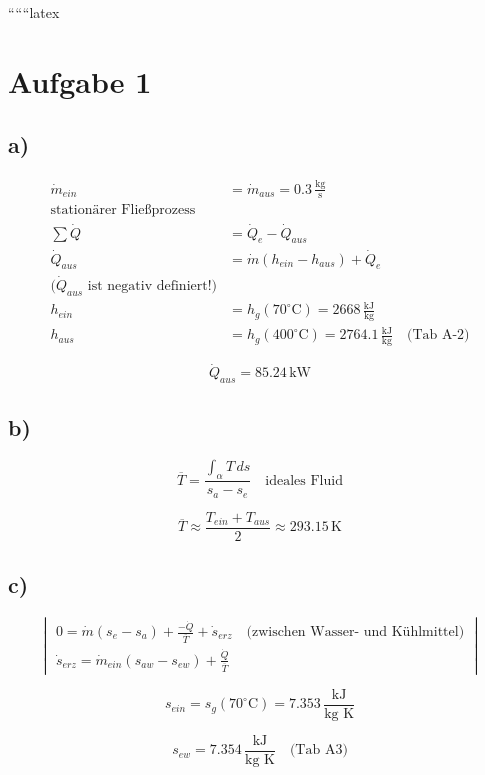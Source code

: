 
``````latex


\section*{Aufgabe 1}

\subsection*{a)}
\begin{align*}
\dot{m}_{ein} &= \dot{m}_{aus} = 0.3 \, \frac{\text{kg}}{\text{s}} \\
\text{stationärer Fließprozess} \\
\sum \dot{Q} &= \dot{Q}_e - \dot{Q}_{aus} \\
\dot{Q}_{aus} &= \dot{m} (h_{ein} - h_{aus}) + \dot{Q}_e \\
\text{(}\dot{Q}_{aus} \text{ ist negativ definiert!)} \\
h_{ein} &= h_{g} (70^\circ \text{C}) = 2668 \, \frac{\text{kJ}}{\text{kg}} \\
h_{aus} &= h_{g} (400^\circ \text{C}) = 2764.1 \, \frac{\text{kJ}}{\text{kg}} \quad \text{(Tab A-2)}
\end{align*}

\[
\dot{Q}_{aus} = 85.24 \, \text{kW}
\]

\subsection*{b)}
\[
\overline{T} = \frac{\int_{\alpha} T \, ds}{s_a - s_e} \quad \text{ideales Fluid}
\]

\[
\overline{T} \approx \frac{T_{ein} + T_{aus}}{2} \approx 293.15 \, \text{K}
\]

\subsection*{c)}
\[
\begin{vmatrix}
0 = \dot{m} (s_e - s_a) + \frac{-\dot{Q}}{\overline{T}} + \dot{s}_{erz} \quad \text{(zwischen Wasser- und Kühlmittel)} \\
\dot{s}_{erz} = \dot{m}_{ein} (s_{aw} - s_{ew}) + \frac{\dot{Q}}{\overline{T}}
\end{vmatrix}
\]

\[
s_{ein} = s_g (70^\circ \text{C}) = 7.353 \, \frac{\text{kJ}}{\text{kg K}}
\]

\[
s_{ew} = 7.354 \, \frac{\text{kJ}}{\text{kg K}} \quad \text{(Tab A3)}
\]

